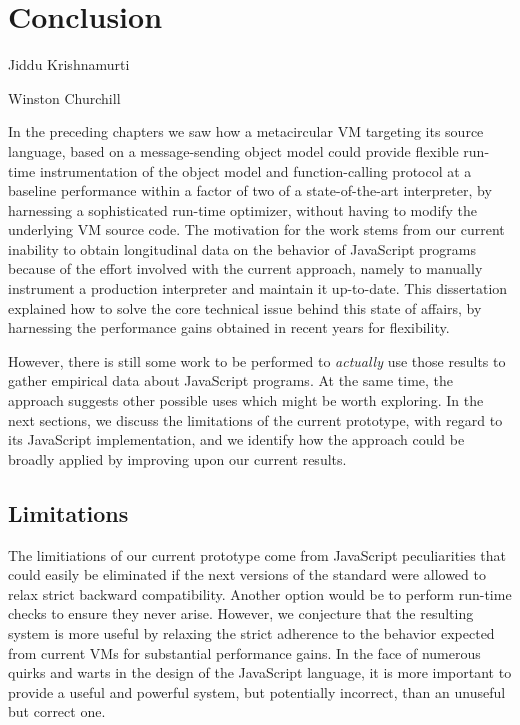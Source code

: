 \chapter{Conclusion}
\label{chap:Conclusion}

{Jiddu Krishnamurti}

{Winston Churchill}


In the preceding chapters we saw how a metacircular VM targeting its source
language, based on a message-sending object model could provide flexible
run-time instrumentation of the object model and function-calling protocol at a
baseline performance within a factor of two of a state-of-the-art interpreter, by
harnessing a sophisticated run-time optimizer, without having to modify the
underlying VM source code. The motivation for the work stems from our current
inability to obtain longitudinal data on the behavior of JavaScript programs
because of the effort involved with the current approach, namely to manually
instrument a production interpreter and maintain it up-to-date. This
dissertation explained how to solve the core technical issue behind this state
of affairs, by harnessing the performance gains obtained in recent years for
flexibility.

However, there is still some work to be performed to \textit{actually} use
those results to gather empirical data about JavaScript programs. At the same
time, the approach suggests other possible uses which might be worth exploring.
In the next sections, we discuss the limitations of the current prototype, with
regard to its JavaScript implementation, and we identify how the approach could
be broadly applied by improving upon our current results.

\section{Limitations}

The limitiations of our current prototype come from JavaScript peculiarities
that could easily be eliminated if the next versions of the standard were
allowed to relax strict backward compatibility. Another option would be
to perform run-time checks to ensure they never arise.  However, we conjecture
that the resulting system is more useful by relaxing the strict adherence to
the behavior expected from current VMs for substantial performance gains.  In
the face of numerous quirks and warts in the design of the JavaScript language,
it is more important to provide a useful and powerful system, but potentially
incorrect, than an unuseful but correct one.

